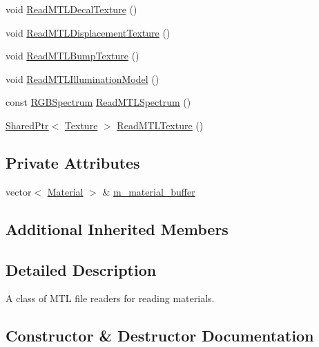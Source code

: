 \begin{DoxyCompactItemize}
void \hyperlink{classmage_1_1_m_t_l_reader_a578df3a55c79fba9d46616791b2e5539}{Read\+M\+T\+L\+Decal\+Texture} ()
\item 
void \hyperlink{classmage_1_1_m_t_l_reader_a9d4f8dea5a5582c5e7b788149110800c}{Read\+M\+T\+L\+Displacement\+Texture} ()
\item 
void \hyperlink{classmage_1_1_m_t_l_reader_acf7aacf933f842d3e14af92d161acd5b}{Read\+M\+T\+L\+Bump\+Texture} ()
\item 
void \hyperlink{classmage_1_1_m_t_l_reader_a77bbb659fe66e9bad451281dbd0c49d7}{Read\+M\+T\+L\+Illumination\+Model} ()
\item 
const \hyperlink{structmage_1_1_r_g_b_spectrum}{R\+G\+B\+Spectrum} \hyperlink{classmage_1_1_m_t_l_reader_a607a55ab2e68d3bc9b879d7e3377f0e3}{Read\+M\+T\+L\+Spectrum} ()
\item 
\hyperlink{namespacemage_a1e01ae66713838a7a67d30e44c67703e}{Shared\+Ptr}$<$ \hyperlink{classmage_1_1_texture}{Texture} $>$ \hyperlink{classmage_1_1_m_t_l_reader_a7ff401dab1b58709debff6cbe2c02d0c}{Read\+M\+T\+L\+Texture} ()
\end{DoxyCompactItemize}
\subsection*{Private Attributes}
\begin{DoxyCompactItemize}
\item 
vector$<$ \hyperlink{structmage_1_1_material}{Material} $>$ \& \hyperlink{classmage_1_1_m_t_l_reader_a6382e0e9fce6581b129d18f5d82994c2}{m\+\_\+material\+\_\+buffer}
\end{DoxyCompactItemize}
\subsection*{Additional Inherited Members}


\subsection{Detailed Description}
A class of M\+TL file readers for reading materials. 

\subsection{Constructor \& Destructor Documentation}
\hypertarget{classmage_1_1_m_t_l_reader_a924f813cca170e2592a6e7d2a3255be8}{}\label{classmage_1_1_m_t_l_reader_a924f813cca170e2592a6e7d2a3255be8} 
